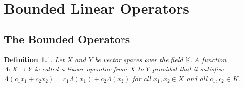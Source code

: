 \documentclass[11pt]{book}
\theoremstyle{break}
\theoremstyle{break}
\newtheorem{defn}{Definition}[corL]
\begin{document}
\newpage
\chapter{Bounded Linear Operators}
\setcounter{section}{17}
\section[The Bounded Operators]{\color{red} The Bounded Operators\color{black}}
\begin{defn}
Let $X$ and $Y$ be vector spaces over the field $\mathbb{K}$. A function $\Lambda: X \to Y$ is called a linear operator from $X$ to $Y$ provided that it satisfies $\Lambda(c_1 x_1 + c_2x_2) = c_1 \Lambda (x_1) + c_2 \Lambda(x_2)$ for all $x_1,x_2 \in X$ and all $c_1,c_2 \in K$.
\end{defn}
\end{document}
